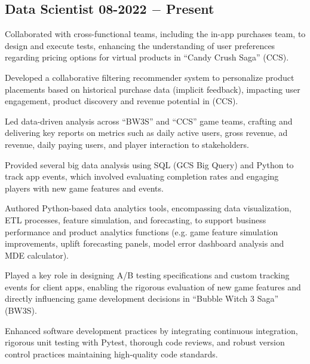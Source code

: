 \subsection{{Data Scientist \hfill 08-2022 $-$ Present}}
\begin{zitemize}
\item Collaborated with cross-functional teams, including the in-app purchases team, to design and execute tests, enhancing the understanding of user preferences regarding pricing options for virtual products in ``Candy Crush Saga'' (CCS).
\item Developed a collaborative filtering recommender system to personalize product placements based on historical purchase data (implicit feedback), impacting user engagement, product discovery and revenue potential in (CCS).
\item Led data-driven analysis across ``BW3S'' and ``CCS'' game teams, crafting and delivering key reports on metrics such as daily active users, gross revenue, ad revenue, daily paying users, and player interaction to stakeholders.
\item Provided several big data analysis using SQL (GCS Big Query) and Python to track app events, which involved evaluating completion rates and engaging players with new game features and events.
\item Authored Python-based data analytics tools, encompassing data visualization, ETL processes, feature simulation, and forecasting, to support business performance and product analytics functions (e.g. game feature simulation improvements, uplift forecasting panels, model error dashboard analysis and MDE calculator).
\item Played a key role in designing A/B testing specifications and custom tracking events for client apps, enabling the rigorous evaluation of new game features and directly influencing game development decisions in ``Bubble Witch 3 Saga'' (BW3S).
\item Enhanced software development practices by integrating continuous integration, rigorous unit testing with Pytest, thorough code reviews, and robust version control practices maintaining high-quality code standards.
\end{zitemize}


